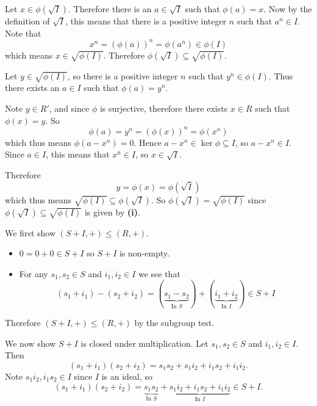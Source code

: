 \begin{questions}
    \item \begin{partquestions}{\roman*}
        \item Let $x \in \phi(\sqrt I)$. Therefore there is an $a \in \sqrt{I}$ such that $\phi(a) = x$. Now by the definition of $\sqrt{I}$, this means that there is a positive integer $n$ such that $a^n \in I$. Note that
        \[
            x^n = \left(\phi(a)\right)^n = \phi(a^n) \in \phi(I)
        \]
        which means $x \in \sqrt{\phi(I)}$. Therefore $\phi(\sqrt I) \subseteq \sqrt{\phi(I)}$.

        \item Let $y \in \sqrt{\phi(I)}$, so there is a positive integer $n$ such that $y^n \in \phi(I)$. Thus there exists an $a \in I$ such that $\phi(a) = y^n$.

        Note $y \in R'$, and since $\phi$ is surjective, therefore there exists $x \in R$ such that $\phi(x) = y$. So
        \[
            \phi(a) = y^n = \left(\phi(x)\right)^n = \phi\left(x^n\right)
        \]
        which thus means $\phi(a-x^n) = 0$. Hence $a-x^n \in \ker\phi \subseteq I$, so $a-x^n \in I$. Since $a \in I$, this means that $x^n \in I$, so $x \in \sqrt{I}$.

        Therefore
        \[
            y = \phi(x) = \phi(\sqrt I)
        \]
        which thus means $\sqrt{\phi(I)} \subseteq \phi(\sqrt I)$. So $\phi(\sqrt I) = \sqrt{\phi(I)}$ since $\phi(\sqrt I) \subseteq \sqrt{\phi(I)}$ is given by \textbf{(i)}.
    \end{partquestions}

    \item \begin{partquestions}{\roman*}
        \item We first show $(S+I, +) \leq (R,+)$.
        \begin{itemize}
            \item $0 = 0 + 0 \in S + I$ so $S + I$ is non-empty.
            \item For any $s_1, s_2 \in S$ and $i_1, i_2 \in I$ we see that
            \[
                (s_1+i_1) - (s_2 + i_2) = (\underbrace{s_1 - s_2}_{\text{In }S}) + (\underbrace{i_1 + i_2}_{\text{In }I}) \in S + I
            \]
        \end{itemize}
        Therefore $(S+I, +) \leq (R,+)$ by the subgroup test.

        We now show $S+I$ is closed under multiplication. Let $s_1, s_2 \in S$ and $i_1, i_2 \in I$. Then
        \[
            (s_1 + i_1)(s_2 + i_2) = s_1s_2 + s_1i_2 + i_1s_2 + i_1i_2.
        \]
        Note $s_1i_2, i_1s_2 \in I$ since $I$ is an ideal, so
        \[
            (s_1 + i_1)(s_2 + i_2) = \underbrace{s_1s_2}_{\text{In }S} + \underbrace{s_1i_2 + i_1s_2 + i_1i_2}_{\text{In }I} \in S + I.
        \]


\end{partquestions}
\end{questions}
